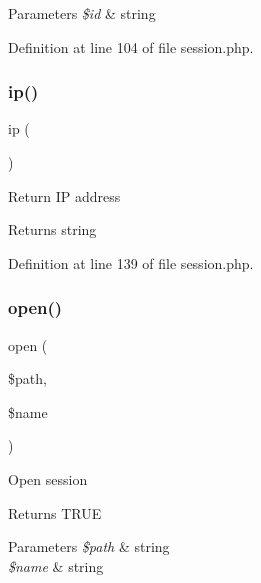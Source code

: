 \begin{DoxyParams}{Parameters}
{\em \$id} & string \\
\hline
\end{DoxyParams}


Definition at line 104 of file session.\+php.

\hypertarget{class_d_b_1_1_jig_1_1_session_a197bae3714812901860bd006b00f91de}{}\label{class_d_b_1_1_jig_1_1_session_a197bae3714812901860bd006b00f91de} 
\subsubsection{\texorpdfstring{ip()}{ip()}}
{\footnotesize\ttfamily ip (\begin{DoxyParamCaption}{ }\end{DoxyParamCaption})}

Return IP address \begin{DoxyReturn}{Returns}
string 
\end{DoxyReturn}


Definition at line 139 of file session.\+php.

\hypertarget{class_d_b_1_1_jig_1_1_session_a037c59224bcb347b69ca61df88ef7230}{}\label{class_d_b_1_1_jig_1_1_session_a037c59224bcb347b69ca61df88ef7230} 
\subsubsection{\texorpdfstring{open()}{open()}}
{\footnotesize\ttfamily open (\begin{DoxyParamCaption}\item[{}]{\$path,  }\item[{}]{\$name }\end{DoxyParamCaption})}

Open session \begin{DoxyReturn}{Returns}
T\+R\+UE 
\end{DoxyReturn}

\begin{DoxyParams}{Parameters}
{\em \$path} & string \\
\hline
{\em \$name} & string \\
\hline
\end{DoxyParams}


